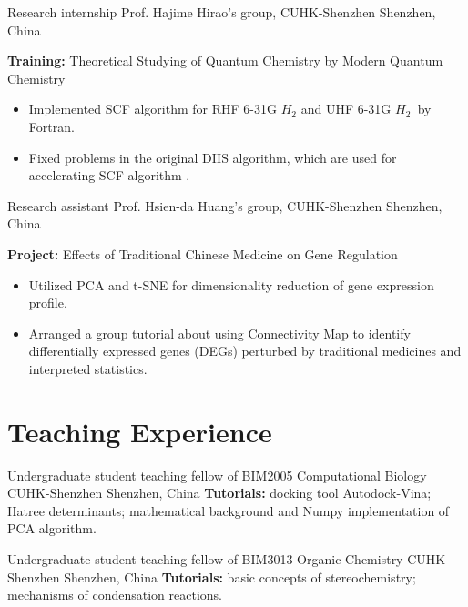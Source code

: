 \documentclass[11pt]{moderncv}
\begin{document}
{Research internship}
{Prof. Hajime Hirao's group, CUHK-Shenzhen}
{Shenzhen, China}
{}
{\textbf{Training:} Theoretical Studying of Quantum Chemistry by Modern Quantum Chemistry
    \begin{itemize}\setlength\itemsep{-1pt}
    \item Implemented SCF algorithm for RHF 6-31G ${H_2}$ and UHF 6-31G ${H_2^-}$ by Fortran.
    \item Fixed problems in the original DIIS algorithm, which are used for accelerating SCF algorithm .
\end{itemize}
}

{Research assistant}
{Prof. Hsien-da Huang's group, CUHK-Shenzhen}
{Shenzhen, China}
{}
{\textbf {Project:} Effects of Traditional Chinese Medicine on Gene Regulation
    \begin{itemize}\setlength\itemsep{-1pt}
    \item Utilized PCA and t-SNE for dimensionality reduction of gene expression profile.
    \item Arranged a group tutorial about using Connectivity Map to identify differentially expressed genes (DEGs) perturbed by traditional medicines and interpreted statistics. 
    \end{itemize}
}

\nocite{*}
\printbibliography[title={Publications}]


\section{Teaching Experience}
{Undergraduate student teaching fellow of BIM2005 Computational Biology}
{CUHK-Shenzhen}
{Shenzhen, China}
{}
{\textbf{Tutorials:} docking tool Autodock-Vina; 
Hatree determinants; 
mathematical background and Numpy implementation of PCA algorithm.}

{Undergraduate student teaching fellow of BIM3013 Organic Chemistry}
{CUHK-Shenzhen}
{Shenzhen, China}
{}
{\textbf{Tutorials:} basic concepts of stereochemistry; mechanisms of condensation reactions.}
\end{document}
